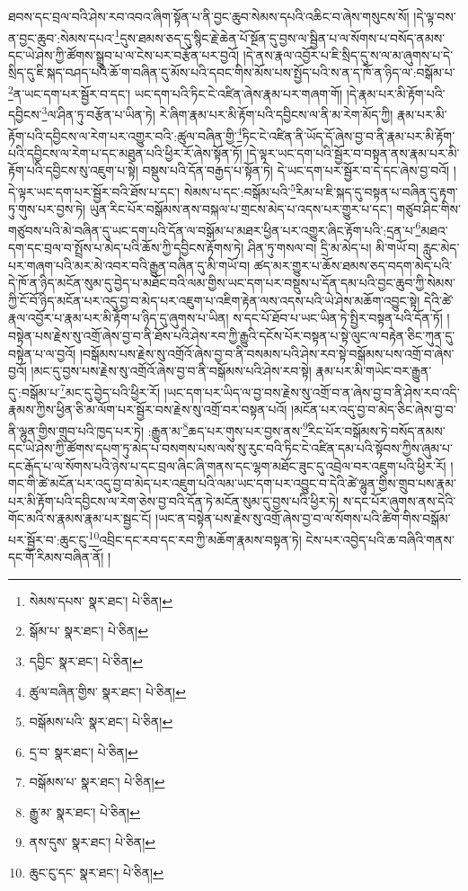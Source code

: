 ཐབས་དང་བྲལ་བའི་ཤེས་རབ་འབའ་ཞིག་སྟོན་པ་ནི་བྱང་ཆུབ་སེམས་དཔའི་འཆིང་བ་ཞེས་གསུངས་སོ། །དེ་ལྟ་བས་ན་བྱང་ཆུབ་:སེམས་དཔའ་\footnote{སེམས་དཔས་  སྣར་ཐང་།  པེ་ཅིན། }དུས་ཐམས་ཅད་དུ་སྙིང་རྗེ་ཆེན་པོ་སྔོན་དུ་བྱས་ལ་སྦྱིན་པ་ལ་སོགས་པ་བསོད་ནམས་དང་ཡེ་ཤེས་ཀྱི་ཚོགས་སྒྲུབ་པ་ལ་ངེས་པར་བརྩོན་པར་བྱའོ། །དེ་ནས་རྣལ་འབྱོར་པ་ཇི་སྲིད་དུ་ས་ལ་མ་ཞུགས་པ་དེ་སྲིད་དུ་ཇི་སྐད་བཤད་པའི་ཆོ་ག་བཞིན་དུ་མོས་པའི་དབང་གིས་མོས་པས་སྤྱོད་པའི་ས་ན་ད་ཁོ་ན་ཉིད་ལ་:བསྒོམ་པ་\footnote{སྒོམ་པ་  སྣར་ཐང་།  པེ་ཅིན། }ན་ཡང་དག་པར་སྦྱོར་བ་དང་། ཡང་དག་པའི་ཏིང་ངེ་འཛིན་ཞེས་རྣམ་པར་གཞག་གོ། །དེ་རྣམ་པར་མི་རྟོག་པའི་དབྱིངས་\footnote{དབྱིང་  སྣར་ཐང་།  པེ་ཅིན། }ལ་ཤིན་ཏུ་བརྩོན་པ་ཡིན་ཏེ། རེ་ཞིག་རྣམ་པར་མི་རྟོག་པའི་དབྱིངས་ལ་ནི་མ་རེག་མོད་ཀྱི། རྣམ་པར་མི་རྟོག་པའི་དབྱིངས་ལ་རེག་པར་འགྱུར་བའི་:ཚུལ་བཞིན་གྱི་\footnote{ཚུལ་བཞིན་གྱིས་  སྣར་ཐང་།  པེ་ཅིན། }ཏིང་ངེ་འཛིན་ནི་ཡོད་དོ་ཞེས་བྱ་བ་ནི་རྣམ་པར་མི་རྟོག་པའི་དབྱིངས་ལ་རེག་པ་དང་མཐུན་པའི་ཕྱིར་རོ་ཞེས་སྟོན་ཏོ། །དེ་ལྟར་ཡང་དག་པའི་སྦྱོར་བ་བསྟན་ནས་རྣམ་པར་མི་རྟོག་པའི་དབྱིངས་སུ་འཇུག་པ་སྟེ། བསྡུས་པའི་དོན་བརྒྱད་པ་སྟོན་ཏེ། དེ་ཡང་དག་པར་སྦྱོར་བ་དེ་དང་ཞེས་བྱ་བའོ། །དེ་ལྟར་ཡང་དག་པར་སྦྱོར་བའི་ཐོས་པ་དང་། སེམས་པ་དང་:བསྒོམ་པའི་\footnote{བསྒོམས་པའི་  སྣར་ཐང་།  པེ་ཅིན། }རིམ་པ་ཇི་སྐད་དུ་བསྟན་པ་བཞིན་དུ་རྟག་ཏུ་གུས་པར་བྱས་ཏེ། ཡུན་རིང་པོར་བསྒོམས་ནས་བསྐལ་པ་གྲངས་མེད་པ་འདས་པར་གྱུར་པ་དང་། གཙུབ་ཤིང་གིས་གཙུབས་པའི་མེ་བཞིན་དུ་ཡང་དག་པའི་དོན་ལ་བསྒོམ་པ་མཐར་ཕྱིན་པར་འགྱུར་ཞིང་རྟོག་པའི་:དྲན་པ་\footnote{དྲ་བ་  སྣར་ཐང་།  པེ་ཅིན། }མཐའ་དག་དང་བྲལ་བ་སྤྲོས་པ་མེད་པའི་ཆོས་ཀྱི་དབྱིངས་རྟོགས་ཏེ། ཤིན་ཏུ་གསལ་བ། དྲི་མ་མེད་པ། མི་གཡོ་བ། རླུང་མེད་པར་གཞག་པའི་མར་མེ་འབར་བའི་རྒྱུན་བཞིན་དུ་མི་གཡོ་བ། ཚད་མར་གྱུར་པ་ཆོས་ཐམས་ཅད་བདག་མེད་པའི་དེ་ཁོ་ན་ཉིད་མངོན་སུམ་དུ་བྱེད་པ་མཐོང་བའི་ལམ་གྱིས་ཡང་དག་པར་བསྡུས་པ་དོན་དམ་པའི་བྱང་ཆུབ་ཀྱི་སེམས་ཀྱི་ངོ་བོ་ཉིད་མངོན་པར་འདུ་བྱ་བ་མེད་པར་འཇུག་པ་འཇིག་རྟེན་ལས་འདས་པའི་ཡེ་ཤེས་མཆོག་འབྱུང་སྟེ། དེའི་ཚེ་རྣལ་འབྱོར་པ་རྣམ་པར་མི་རྟོག་པ་ཉིད་དུ་ཞུགས་པ་ཡིན། ས་དང་པོ་ཐོབ་པ་ཡང་ཡིན་ཏེ་སྤྱིར་བསྟན་པའི་དོན་ཏོ། །བསྟེན་པས་རྗེས་སུ་འགྲོ་ཞེས་བྱ་བ་ནི་ཐོས་པའི་ཤེས་རབ་ཀྱི་རྒྱུའི་དངོས་པོར་བསྟན་པ་སྟེ་ལུང་ལ་བརྟེན་ཅིང་ཀུན་དུ་བསྟེན་པ་ལ་བྱའོ། །བསྒོམས་པས་རྗེས་སུ་འགྲོའོ་ཞེས་བྱ་བ་ནི་བསམས་པའི་ཤེས་རབ་སྟེ་བསྒོམས་པས་འགྲོ་བ་ཞེས་བྱའོ། །མང་དུ་བྱས་པས་རྗེས་སུ་འགྲོའོ་ཞེས་བྱ་བ་ནི་བསྒོམས་པའི་ཤེས་རབ་སྟེ། རྣམ་པར་མི་གཡེང་བར་རྒྱུན་དུ་:བསྒོམ་པ་\footnote{བསྒོམས་པ་  སྣར་ཐང་།  པེ་ཅིན། }མང་དུ་བྱེད་པའི་ཕྱིར་རོ། །ཡང་དག་པར་ཡིད་ལ་བྱ་བས་རྗེས་སུ་འགྲོ་བ་ན་ཞེས་བྱ་བ་ནི་ཤེས་རབ་འདི་རྣམས་ཀྱིས་ཕྱིན་ཅི་མ་ལོག་པར་སྦྱོར་བས་རྗེས་སུ་འགྲོ་བར་བསྟན་པའོ། །མངོན་པར་འདུ་བྱ་བ་མེད་ཅིང་ཞེས་བྱ་བ་ནི་ལྷུན་གྱིས་གྲུབ་པའི་ཁྱད་པར་ཏེ། :རྒྱུན་མ་\footnote{རྒྱུ་མ་  སྣར་ཐང་།  པེ་ཅིན། }ཆད་པར་གུས་པར་བྱས་ནས་\footnote{ནས་དུས་  སྣར་ཐང་།  པེ་ཅིན། }རིང་པོར་བསྒོམས་ཏེ་བསོད་ནམས་དང་ཡེ་ཤེས་ཀྱི་ཚོགས་དཔག་ཏུ་མེད་པ་བསགས་པས་ལས་སུ་རུང་བའི་ཏིང་ངེ་འཛིན་དམ་པའི་སྟོབས་ཀྱིས་ཞུམ་པ་དང་རྒོད་པ་ལ་སོགས་པའི་ཉེས་པ་དང་བྲལ་ཞིང་ཞི་གནས་དང་ལྷག་མཐོང་ཟུང་དུ་འབྲེལ་བར་འཇུག་པའི་ཕྱིར་རོ། །གང་གི་ཚེ་མངོན་པར་འདུ་བྱ་བ་མེད་པར་འཇུག་པའི་ལམ་ཡང་དག་པར་འབྱུང་བ་དེའི་ཚེ་ལྷུན་གྱིས་གྲུབ་པས་རྣམ་པར་མི་རྟོག་པའི་དབྱིངས་ལ་རེག་ཅེས་བྱ་བའི་དོན་ཏེ་མངོན་སུམ་དུ་བྱས་པའི་ཕྱིར་ཏེ། ས་དང་པོར་ཞུགས་ནས་དེའི་གོང་མའི་ས་རྣམས་རྣམ་པར་སྦྱང་ངོ། །ཡང་ན་བསྟེན་པས་རྗེས་སུ་འགྲོ་ཞེས་བྱ་བ་ལ་སོགས་པའི་ཚིག་གིས་བསྒོམ་པར་སྦྱོར་བ་:ཆུང་ངུ་\footnote{ཆུང་ངུ་དང་  སྣར་ཐང་།  པེ་ཅིན། }འབྲིང་དང་རབ་དང་རབ་ཀྱི་མཆོག་རྣམས་བསྟན་ཏེ། ངེས་པར་འབྱེད་པའི་ཆ་བཞིའི་གནས་དང་གོ་རིམས་བཞིན་ནོ། །
